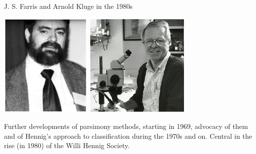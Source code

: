 \documentclass[bluish,slideColor,colorBG,pdf]{prosper}
\begin{document}
\begin{slide}[Replace]{J. S. Farris and Arnold Kluge in the 1980s}

\begin{center}
\includegraphics[height=2in]{Farris3b.ps} \includegraphics[height=2in]{kluge.ps}
\end{center}

Further developments of parsimony methods, starting in 1969, advocacy of them
and of Hennig's
approach to classification during the 1970s and on.  Central in the rise (in
1980) of the Willi Hennig Society.

\end{slide}
\end{document}
